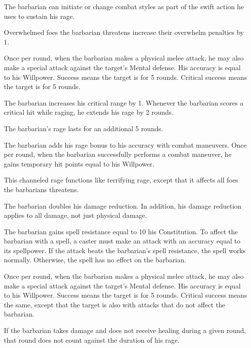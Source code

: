 The barbarian can initiate or change combat styles as part of the swift action he uses to sustain his rage.

Overwhelmed foes the barbarian threatens increase their overwhelm penalties by 1.

Once per round, when the barbarian makes a physical melee attack, he may also make a special attack against the target's Mental defense.
His accuracy is equal to his Willpower.
Success means the target is \shaken for 5 rounds.
Critical success means the target is \frightened for 5 rounds.
\norepeatnotes

The barbarian increases his critical range by 1. Whenever the barbarian scores a critical hit while raging, he extends his rage by 2 rounds.

The barbarian's rage lasts for an additional 5 rounds.

The barbarian adds his rage bonus to his accuracy with combat maneuvers.
Once per round, when the barbarian successfully performs a combat maneuver, he gains temporary hit points equal to his Willpower.

This channeled rage functions like terrifying rage, except that it affects all foes the barbarians threatens.

The barbarian doubles his damage reduction.
In addition, his damage reduction applies to all damage, not just physical damage.

The barbarian gains spell resistance equal to 10 \add his Constitution.
To affect the barbarian with a spell, a caster must make an attack with an accuracy equal to its spellpower.
If the attack beats the barbarian's spell resistance, the spell works normally.
Otherwise, the spell has no effect on the barbarian.

Once per round, when the barbarian makes a physical melee attack, he may also make a special attack against the target's Mental defense.
His accuracy is equal to his Willpower.
Success means the target is \taunted for 5 rounds.
Critical success means the same, except that the target is also \severelyimpaired with attacks that do not affect the barbarian.
\norepeatnotes

If the barbarian takes damage and does not receive healing during a given round, that round does not count against the duration of his rage.

